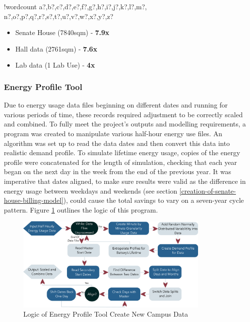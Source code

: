 \documentclass[fontsize=9.5pt]{extarticle}
\numberwithin{figure}{section} %
\providecommand{\tightlist}{%
  \setlength{\itemsep}{0pt}\setlength{\parskip}{0pt}}
\newcounter{words}
\newenvironment{counted}{%
  \setcounter{words}{0}
  \SearchList!{wordcount}{\stepcounter{words}}
    {a?,b?,c?,d?,e?,f?,g?,h?,i?,j?,k?,l?,m?,
    n?,o?,p?,q?,r?,s?,t?,u?,v?,w?,x?,y?,z?}
  \UndoBoundary{'}
  \SearchOrder{p;}}{%
  \StopSearching}
\begin{document}
\begin{counted}
\begin{itemize}
\tightlist
\item
  Senate House (7840sqm) - \textbf{7.9x}
\item
  Hall data (2761sqm) - \textbf{7.6x}
\item
  Lab data (1 Lab Use) - \textbf{4x}
\end{itemize}

\subsubsection{Energy Profile Tool}\label{energy-profile-tool}

Due to energy usage data files beginning on different dates and running
for various periods of time, these records required adjustment to be
correctly scaled and combined. To fully meet the project's outputs and
modelling requirements, a program was created to manipulate various
half-hour energy use files. An algorithm was set up to read the data
dates and then convert this data into realistic demand profile. To
simulate lifetime energy usage, copies of the energy profile were
concatenated for the length of simulation, checking that each year began
on the next day in the week from the end of the previous year. It was
imperative that dates aligned, to make sure results were valid as the
difference in energy usage between weekdays and weekends (see section
\ref{creation-of-senate-house-billing-model}), could cause the total
savings to vary on a seven-year cycle pattern. Figure
\ref{EnergyProfileTool} outlines the logic of this program.

\begin{figure}[H]
 \centering
 \includegraphics[trim = 0 0 0 0, clip, width=0.85\textwidth]{EnergyProfileTool.eps}
 \caption{Logic of Energy Profile Tool Create New Campus Data}
 \label{EnergyProfileTool}
 \vspace{-20pt}
 \end{figure}


\end{counted}
\end{document}
